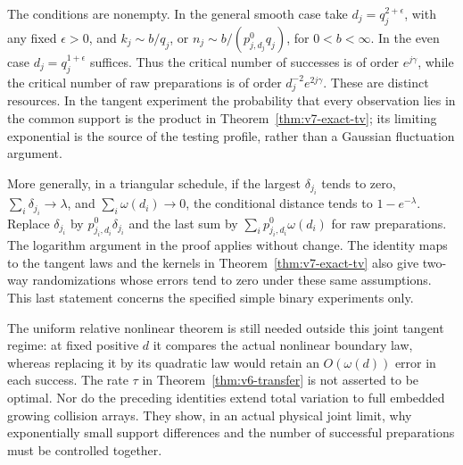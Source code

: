 The conditions are nonempty. In the general smooth case take
$d_j=q_j^{2+\epsilon}$, with any fixed $\epsilon>0$, and
$k_j\sim b/q_j$, or $n_j\sim b/(p_{j,d_j}^0q_j)$, for $0<b<\infty$.
In the even case $d_j=q_j^{1+\epsilon}$ suffices. Thus the critical
number of successes is of order $e^{j\gamma}$, while the critical
number of raw preparations is of order $d_j^{-2}e^{2j\gamma}$.
These are distinct resources. In the tangent experiment the probability
that every observation lies in the common support is the product in
Theorem~\ref{thm:v7-exact-tv}; its limiting exponential is the source
of the testing profile, rather than a Gaussian fluctuation argument.

More generally, in a triangular schedule, if the largest $\delta_{j_i}$
tends to zero, $\sum_i\delta_{j_i}\to\lambda$, and
$\sum_i\omega(d_i)\to0$, the conditional distance tends to
$1-e^{-\lambda}$. Replace $\delta_{j_i}$ by
$p_{j_i,d_i}^0\delta_{j_i}$ and the last sum by
$\sum_i p_{j_i,d_i}^0\omega(d_i)$ for raw preparations.
The logarithm argument in the proof applies without change.
The identity maps to the tangent laws and the kernels in
Theorem~\ref{thm:v7-exact-tv} also give two-way randomizations whose
errors tend to zero under these same assumptions. This last statement
concerns the specified simple binary experiments only.

The uniform relative nonlinear theorem is still needed outside this
joint tangent regime: at fixed positive $d$ it compares the actual
nonlinear boundary law, whereas replacing it by its quadratic law
would retain an $O(\omega(d))$ error in each success. The rate $\tau$
in Theorem~\ref{thm:v6-transfer} is not asserted to be optimal.
Nor do the preceding identities extend total variation to full
embedded growing collision arrays. They show, in an actual physical
joint limit, why exponentially small support differences and the
number of successful preparations must be controlled together.
